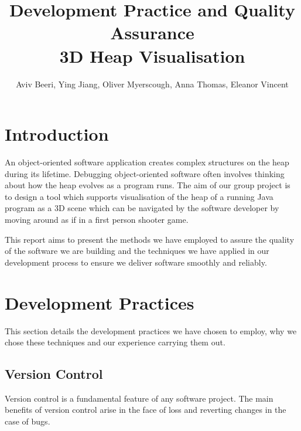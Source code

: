 \documentclass[10pt, a4paper]{article}
\begin{document}
\title{Development Practice and Quality Assurance
\\ 3D Heap Visualisation}
\author{Aviv Beeri, Ying Jiang, Oliver Myerscough, Anna Thomas, Eleanor Vincent}
\maketitle

\section{Introduction}

An object-oriented software application creates complex structures on the heap during its lifetime. Debugging object-oriented software often involves thinking about how the heap evolves as a program runs. The aim of our group project is to design a tool which supports visualisation of the heap of a running Java program as a 3D scene which can be navigated by the software developer by moving around as if in a first person shooter game.

This report aims to present the methods we have employed to assure the quality of the software we are building and the techniques we have applied in our development process to ensure we deliver software smoothly and reliably. 

\section{Development Practices}

This section details the development practices we have chosen to employ, why we chose these techniques and our experience carrying them out. 

\subsection{Version Control}

Version control is a fundamental feature of any software project. The main benefits of version  control arise in the face of loss and reverting changes in the case of bugs.
\end{document}
